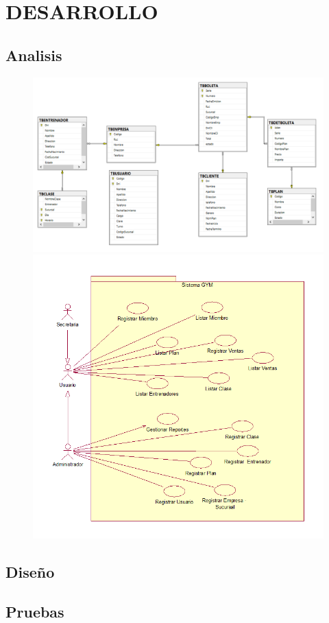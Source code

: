 \section{DESARROLLO} 
\subsection{Analisis}
	\begin{figure}[htb]
		\begin{center}
			\includegraphics[width=15cm]{./Imagenes/MEntidadRelacion}
		\end{center}
	
	
		\begin{center}
			\includegraphics[width=15cm]{./Imagenes/CasosDeUso}
		\end{center}
	\end{figure}
	
\subsection{Diseño}
\subsection{Pruebas}






